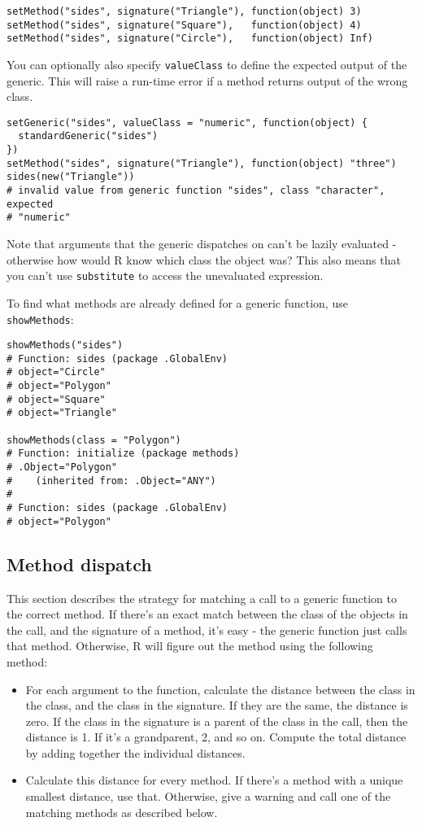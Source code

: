\begin{verbatim}
setMethod("sides", signature("Triangle"), function(object) 3)
setMethod("sides", signature("Square"),   function(object) 4)
setMethod("sides", signature("Circle"),   function(object) Inf)
\end{verbatim}

You can optionally also specify \texttt{valueClass} to define the
expected output of the generic. This will raise a run-time error if a
method returns output of the wrong class.

\begin{verbatim}
setGeneric("sides", valueClass = "numeric", function(object) {
  standardGeneric("sides")
})
setMethod("sides", signature("Triangle"), function(object) "three")
sides(new("Triangle"))
# invalid value from generic function "sides", class "character", expected
# "numeric"
\end{verbatim}

Note that arguments that the generic dispatches on can't be lazily
evaluated - otherwise how would R know which class the object was? This
also means that you can't use \texttt{substitute} to access the
unevaluated expression.

To find what methods are already defined for a generic function, use
\texttt{showMethods}:

\begin{verbatim}
showMethods("sides")
# Function: sides (package .GlobalEnv)
# object="Circle"
# object="Polygon"
# object="Square"
# object="Triangle"

showMethods(class = "Polygon")
# Function: initialize (package methods)
# .Object="Polygon"
#    (inherited from: .Object="ANY")
# 
# Function: sides (package .GlobalEnv)
# object="Polygon"
\end{verbatim}

\subsection{Method dispatch}

This section describes the strategy for matching a call to a generic
function to the correct method. If there's an exact match between the
class of the objects in the call, and the signature of a method, it's
easy - the generic function just calls that method. Otherwise, R will
figure out the method using the following method:

\begin{itemize}
\item
  For each argument to the function, calculate the distance between the
  class in the class, and the class in the signature. If they are the
  same, the distance is zero. If the class in the signature is a parent
  of the class in the call, then the distance is 1. If it's a
  grandparent, 2, and so on. Compute the total distance by adding
  together the individual distances.
\item
  Calculate this distance for every method. If there's a method with a
  unique smallest distance, use that. Otherwise, give a warning and call
  one of the matching methods as described below.
\end{itemize}

